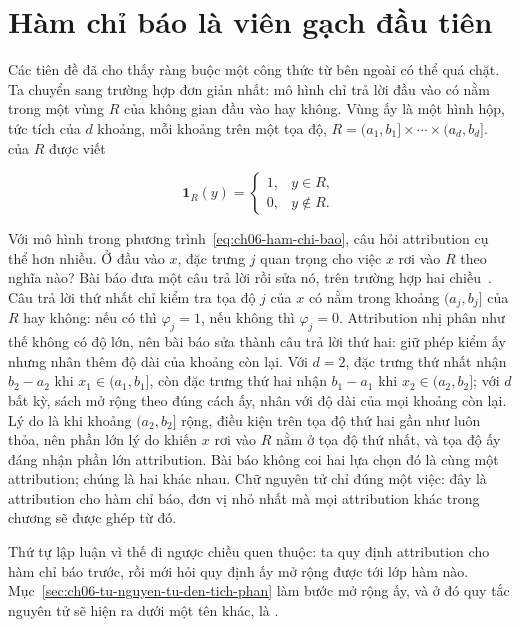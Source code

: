 \section{Hàm chỉ báo là viên gạch đầu tiên}
\label{sec:ch06-ham-chi-bao}

%
Các tiên đề đã cho thấy ràng buộc một công thức từ bên ngoài có thể quá chặt.
Ta chuyển sang trường hợp đơn giản nhất: mô hình chỉ trả lời đầu vào có nằm
trong một vùng $R$ của không gian đầu vào hay không. Vùng ấy là một hình hộp,
tức tích của $d$ khoảng, mỗi khoảng trên một tọa độ,
$R=(a_1,b_1]\times\cdots\times(a_d,b_d]$. 
của $R$ được viết

\begin{equation}
\label{eq:ch06-ham-chi-bao}
\mathbf{1}_R(y)=
\begin{cases}
1, & y\in R,\\
0, & y\notin R.
\end{cases}
\end{equation}

Với mô hình trong phương trình~\ref{eq:ch06-ham-chi-bao}, câu hỏi attribution
cụ thể hơn nhiều. Ở đầu vào $x$, đặc trưng $j$ quan trọng cho việc $x$ rơi vào
$R$ theo nghĩa nào? Bài báo đưa một câu trả lời rồi sửa nó, trên trường hợp
hai chiều~\autocite{p17firstprinciples}. Câu trả lời thứ nhất chỉ kiểm tra tọa
độ $j$ của $x$ có nằm trong khoảng $(a_j,b_j]$ của $R$ hay không: nếu có thì
$\varphi_j=1$, nếu không thì $\varphi_j=0$. Attribution nhị phân như thế không
có độ lớn, nên bài báo sửa thành câu trả lời thứ hai: giữ phép kiểm ấy nhưng
nhân thêm độ dài của khoảng còn lại. Với $d=2$, đặc trưng thứ nhất nhận
$b_2-a_2$ khi $x_1\in(a_1,b_1]$, còn đặc trưng thứ hai nhận $b_1-a_1$ khi
$x_2\in(a_2,b_2]$; với $d$ bất kỳ, sách mở rộng theo đúng cách ấy, nhân với độ
dài của mọi khoảng còn lại. Lý do là khi khoảng $(a_2,b_2]$ rộng, điều kiện
trên tọa độ thứ hai gần như luôn thỏa, nên phần lớn lý do khiến $x$ rơi vào
$R$ nằm ở tọa độ thứ nhất, và tọa độ ấy đáng nhận phần lớn attribution. Bài
báo không coi hai lựa chọn đó là cùng một attribution; chúng là hai
 khác nhau. Chữ nguyên tử chỉ
đúng một việc: đây là attribution cho hàm chỉ báo, đơn vị nhỏ nhất mà mọi
attribution khác trong chương sẽ được ghép từ đó.

Thứ tự lập luận vì thế đi ngược chiều quen thuộc: ta quy định attribution cho
hàm chỉ báo trước, rồi mới hỏi quy định ấy mở rộng được tới lớp hàm nào.
Mục~\ref{sec:ch06-tu-nguyen-tu-den-tich-phan} làm bước mở rộng ấy, và ở đó quy
tắc nguyên tử sẽ hiện ra dưới một tên khác, là .
